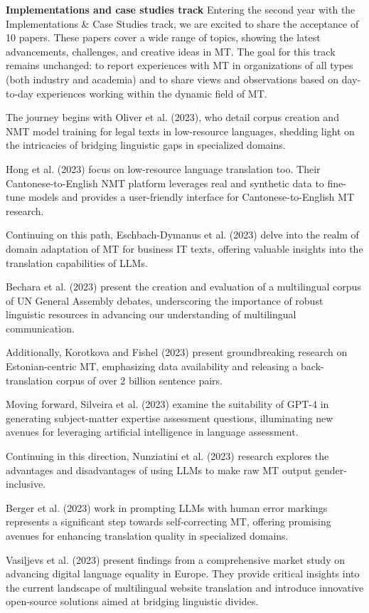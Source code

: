 {\bf Implementations and case studies track}
Entering the second year with the Implementations \& Case Studies track, we are excited to share the acceptance of 10 papers. These papers cover a wide range of topics, showing the latest advancements, challenges, and creative ideas in MT. The goal for this track remains unchanged: to report experiences with MT in organizations of all types (both industry and academia) and to share views and observations based on day-to-day experiences working within the dynamic field of MT.

The journey begins with Oliver et al. (2023), who detail corpus creation and NMT model training for legal texts in low-resource languages, shedding light on the intricacies of bridging linguistic gaps in specialized domains.

Hong et al. (2023) focus on low-resource language translation too. Their Cantonese-to-English NMT platform leverages real and synthetic data to fine-tune models and provides a user-friendly interface for Cantonese-to-English MT research.

Continuing on this path, Eschbach-Dymanus et al. (2023) delve into the realm of domain adaptation of MT for business IT texts, offering valuable insights into the translation capabilities of LLMs.

Bechara et al. (2023) present the creation and evaluation of a multilingual corpus of UN General Assembly debates, underscoring the importance of robust linguistic resources in advancing our understanding of multilingual communication.

Additionally, Korotkova and Fishel (2023) present groundbreaking research on Estonian-centric MT, emphasizing data availability and releasing a back-translation corpus of over 2 billion sentence pairs.

Moving forward, Silveira et al. (2023) examine the suitability of GPT-4 in generating subject-matter expertise assessment questions, illuminating new avenues for leveraging artificial intelligence in language assessment.

Continuing in this direction, Nunziatini et al. (2023) research explores the advantages and disadvantages of using LLMs to make raw MT output gender-inclusive.

Berger et al. (2023) work in prompting LLMs with human error markings represents a significant step towards self-correcting MT, offering promising avenues for enhancing translation quality in specialized domains.

Vasiļjevs et al. (2023) present findings from a comprehensive market study on advancing digital language equality in Europe. They provide critical insights into the current landscape of multilingual website translation and introduce innovative open-source solutions aimed at bridging linguistic divides.


